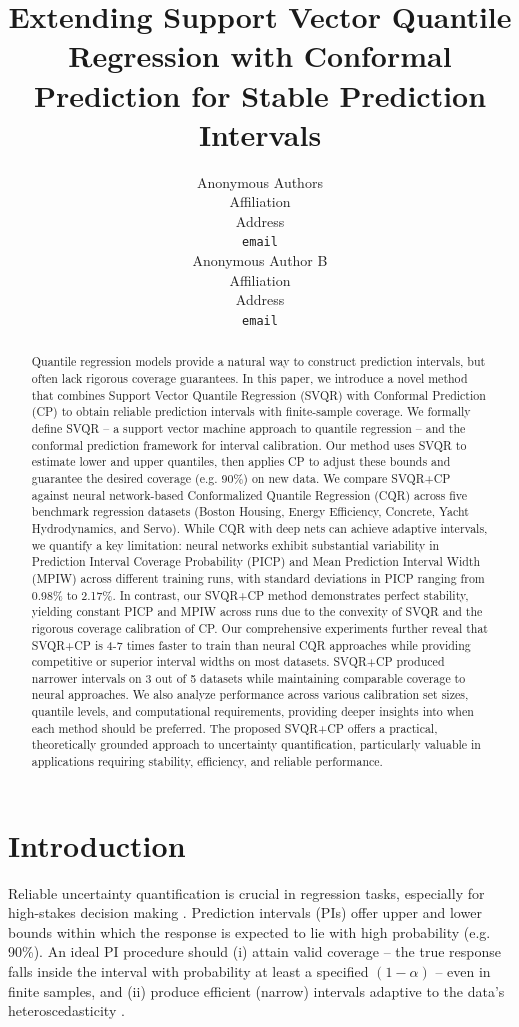 \documentclass{article}
\title{Extending Support Vector Quantile Regression with Conformal Prediction for Stable Prediction Intervals}
\author{
  Anonymous Authors \\
  Affiliation \\
  Address \\
  \texttt{email} \\
  \And
  Anonymous Author B \\
  Affiliation \\
  Address \\
  \texttt{email} \\
}
\begin{document}
\maketitle

\begin{abstract}
Quantile regression models provide a natural way to construct prediction intervals, but often lack rigorous coverage guarantees. In this paper, we introduce a novel method that combines Support Vector Quantile Regression (SVQR) with Conformal Prediction (CP) to obtain reliable prediction intervals with finite-sample coverage. We formally define SVQR -- a support vector machine approach to quantile regression -- and the conformal prediction framework for interval calibration. Our method uses SVQR to estimate lower and upper quantiles, then applies CP to adjust these bounds and guarantee the desired coverage (e.g. 90\%) on new data. We compare SVQR+CP against neural network-based Conformalized Quantile Regression (CQR) \citep{Romano2019ConformalizedQR} across five benchmark regression datasets (Boston Housing, Energy Efficiency, Concrete, Yacht Hydrodynamics, and Servo). While CQR with deep nets can achieve adaptive intervals, we quantify a key limitation: neural networks exhibit substantial variability in Prediction Interval Coverage Probability (PICP) and Mean Prediction Interval Width (MPIW) across different training runs, with standard deviations in PICP ranging from 0.98\% to 2.17\%. In contrast, our SVQR+CP method demonstrates perfect stability, yielding constant PICP and MPIW across runs due to the convexity of SVQR and the rigorous coverage calibration of CP. Our comprehensive experiments further reveal that SVQR+CP is 4-7 times faster to train than neural CQR approaches while providing competitive or superior interval widths on most datasets. SVQR+CP produced narrower intervals on 3 out of 5 datasets while maintaining comparable coverage to neural approaches. We also analyze performance across various calibration set sizes, quantile levels, and computational requirements, providing deeper insights into when each method should be preferred. The proposed SVQR+CP offers a practical, theoretically grounded approach to uncertainty quantification, particularly valuable in applications requiring stability, efficiency, and reliable performance.
\end{abstract}


\section{Introduction}
Reliable uncertainty quantification is crucial in regression tasks, especially for high-stakes decision making \citep{Romano2019ConformalizedQR}. Prediction intervals (PIs) offer upper and lower bounds within which the response is expected to lie with high probability (e.g. 90\%). An ideal PI procedure should (i) attain valid coverage -- the true response falls inside the interval with probability at least a specified $(1-\alpha)$ -- even in finite samples, and (ii) produce efficient (narrow) intervals adaptive to the data's heteroscedasticity \citep{Romano2019ConformalizedQR}.
\end{document}
